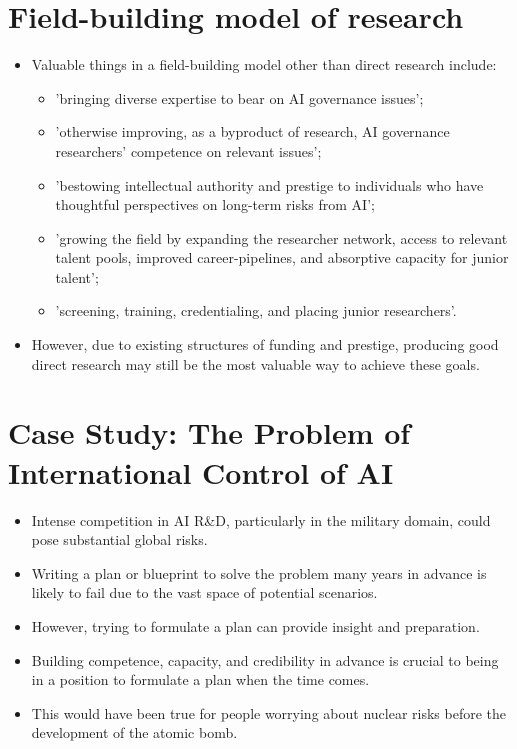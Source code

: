 \documentclass{article}
\begin{document}
\begin{multicols}{2}
\section{Field-building model of research}
\begin{itemize}
    \item Valuable things in a field-building model other than direct research include:
    \begin{itemize}
        \item 'bringing diverse expertise to bear on AI governance issues'; 
        \item 'otherwise improving, as a byproduct of research, AI governance researchers' competence on relevant issues'; 
        \item 'bestowing intellectual authority and prestige to individuals who have thoughtful perspectives on long-term risks from AI'; 
        \item 'growing the field by expanding the researcher network, access to relevant talent pools, improved career-pipelines, and absorptive capacity for junior talent';
        \item 'screening, training, credentialing, and placing junior researchers'.
    \end{itemize}
    \item However, due to existing structures of funding and prestige, producing good direct research may still be the most valuable way to achieve these goals.
\end{itemize}
\section{Case Study: The Problem of International Control of AI}
\begin{itemize}
    \item Intense competition in AI R\&D, particularly in the military domain, could pose substantial global risks.
    \item Writing a plan or blueprint to solve the problem many years in advance is likely to fail due to the vast space of potential scenarios.
    \item However, trying to formulate a plan can provide insight and preparation.
    \item Building competence, capacity, and credibility in advance is crucial to being in a position to formulate a plan when the time comes.
    \item This would have been true for people worrying about nuclear risks before the development of the atomic bomb.
\end{itemize}
\end{multicols}
\end{document}
